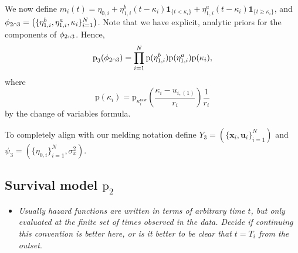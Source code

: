 \documentclass[
  10pt,
  a4paper,
]{article}
\providecommand{\tightlist}{%
  \setlength{\itemsep}{0pt}\setlength{\parskip}{0pt}}
\let\Oldcap\cap
\renewcommand{\cap}{\mathrel{\mathsmaller{\Oldcap}}}
\newcommand{\pd}{\text{p}}
\begin{document}
We now define
\(m_{i}(t) = \eta_{0, i} + \eta^{b}_{1, i}(t - \kappa_{i})\boldsymbol{1}_{\{t < \kappa_{i}\}} + \eta^{a}_{1, i}(t - \kappa_{i})\boldsymbol{1}_{\{t \geq \kappa_{i}\}}\),
and
\(\phi_{2 \cap 3} = \left(\{\eta^{b}_{1, i}, \eta^{a}_{1, i}, \kappa_{i}\}_{i = 1}^{N}\right)\).
Note that we have explicit, analytic priors for the components of
\(\phi_{2 \cap 3}\). Hence, \begin{equation}
  \pd_{3}(\phi_{2 \cap 3}) = \prod_{i = 1}^{N} \pd(\eta^{b}_{1, i}) \pd(\eta^{a}_{1, i}) \pd(\kappa_{i}),
\end{equation} where \begin{equation}
  \pd(\kappa_{i}) = \pd_{\kappa^{\text{raw}}_{i}}(\frac{\kappa_{i} - u_{i, (1)}}{r_{i}}) \frac{1}{r_{i}}
\end{equation} by the change of variables formula.

To completely align with our melding notation define
\(Y_{3} = (\{\boldsymbol{x}_{i}, \boldsymbol{u}_{i}\}_{i = 1}^{N})\) and
\(\psi_{3} = (\{\eta_{0, i}\}_{i = 1}^{N}, \sigma^{2}_{x})\).

\hypertarget{survival-model-pd_2}{%
\subsection{\texorpdfstring{Survival model
\(\pd_{2}\)}{Survival model \textbackslash pd\_\{2\}}}\label{survival-model-pd_2}}

\begin{itemize}
\tightlist
\item
  \emph{Usually hazard functions are written in terms of arbitrary time
  \(t\), but only evaluated at the finite set of times observed in the
  data. Decide if continuing this convention is better here, or is it
  better to be clear that \(t = T_{i}\) from the outset}.
\end{itemize}
\end{document}
